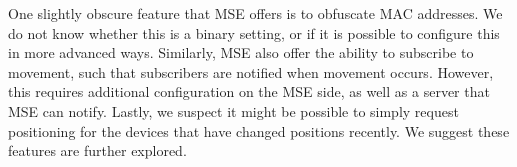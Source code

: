 One slightly obscure feature that MSE offers is to obfuscate MAC addresses. We do not know whether this is a binary setting, or if it is possible to configure this in more advanced ways. Similarly, MSE also offer the ability to subscribe to movement, such that subscribers are notified when movement occurs. However, this requires additional configuration on the MSE side, as well as a server that MSE can notify. Lastly, we suspect it might be possible to simply request positioning for the devices that have changed positions recently. We suggest these features are further explored.

 


